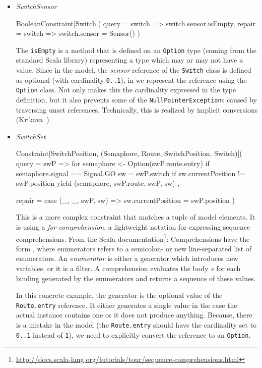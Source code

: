 \begin{itemize}[---]
  \item \emph{SwitchSensor}
  \begin{scalacode}
  BooleanConstraint[Switch](
    query = switch => switch.sensor.isEmpty,
    repair = switch => switch.sensor = Sensor()
  )
  \end{scalacode}
  The \texttt{isEmpty} is a method that is defined on an \texttt{Option} type (coming from the standard Scala library) representing a type which may or may not have a value.
  Since in the model, the \emph{sensor} reference of the \texttt{Switch} class is defined as optional (with cardinality \texttt{0..1}), in \SIGMA we represent the reference using the \texttt{Option} class.
  Not only makes this the cardinality expressed in the type definition, but it also prevents some of the \texttt{NullPointerException}s caused by traversing unset references.
  Technically, this is realized by implicit conversions (\Cf Krikava~\Etal \cite{Krikava2014}).

  \item \emph{SwitchSet}
  \begin{scalacode}
  Constraint[SwitchPosition, (Semaphore, Route, SwitchPosition, Switch)](
    query = swP => {
      for {
        semaphore <- Option(swP.route.entry) if semaphore.signal == Signal.GO
        sw = swP.switch if sw.currentPosition != swP.position
      } yield (semaphore, swP.route, swP, sw)
    },

    repair = {
      case (_, _, swP, sw) => sw.currentPosition = swP.position
    }
  )
  \end{scalacode}
  This is a more complex constraint that matches a tuple of model elements.
  It is using a \emph{for comprehension}, a lightweight notation for expressing sequence comprehensions.
  From the Scala documentation\footnote{\url{http://docs.scala-lang.org/tutorials/tour/sequence-comprehensions.html}}:
  Comprehensions have the form , where enumerators refers to a semicolon- or new line-separated list of enumerators.
  An \emph{enumerator} is either a generator which introduces new variables, or it is a filter.
  A comprehension evaluates the body \emph{e} for each binding generated by the enumerators and returns a sequence of these values.
  
  In this concrete example, the generator is the optional value of the \texttt{Route.entry} reference.
  It either generates a single value in the case the actual instance contains one or it does not produce anything.
  Because, there is a mistake in the model (the \texttt{Route.entry} should have the cardinality set to \texttt{0..1} instead of \texttt{1}), we need to explicitly convert the reference to an \texttt{Option}.


\end{itemize}
